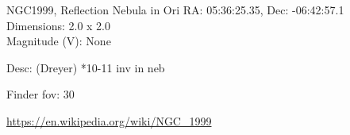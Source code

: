 \begin{block}{NGC1999, Reflection Nebula in Ori}
    RA: 05:36:25.35, Dec: -06:42:57.1 \\ 
    Dimensions: 2.0 x 2.0 \\ 
    Magnitude (V): None


    Desc: (Dreyer) *10-11 inv in neb 

    Finder fov: 30 

    \url{https://en.wikipedia.org/wiki/NGC_1999} 
\end{block}